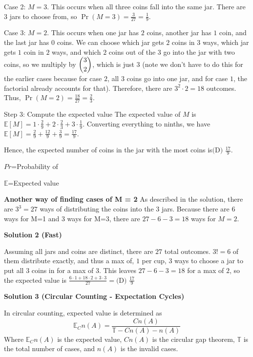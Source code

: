 \begin{enumerate}
 Case 2:  $M = 3$. This occurs when all three coins fall into the same jar. There are $3$ jars to choose from, so $\Pr(M=3) = \frac{3}{27} = \frac{1}{9}$.

 Case 3:  $M = 2$. This occurs when one jar has $2$ coins, another jar has $1$ coin, and the last jar has $0$ coins.  We can choose which jar gets $2$ coins in $3$ ways, which jar gets $1$ coin in $2$ ways, and which $2$ coins out of the $3$ go into the jar with two coins, so we multiply by $\dbinom{3}{2}$, which is just $3$ (note we don't have to do this for the earlier cases because for case $2$, all $3$ coins go into one jar, and for case $1$, the factorial already accounts for that). Therefore, there are $3^2 \cdot 2 = 18$ outcomes. Thus, $\Pr(M=2) = \frac{18}{27} = \frac{2}{3}$.

 Step 3: Compute the expected value The expected value of $M$ is $\mathbb{E}[M] = 1 \cdot \frac{2}{9} + 2 \cdot \frac{2}{3} + 3 \cdot \frac{1}{9}$.  Converting everything to ninths, we have $\mathbb{E}[M] = \frac{2}{9} + \frac{12}{9} + \frac{3}{9} = \frac{17}{9}$.

 Hence, the expected number of coins in the jar with the most coins is$\boxed{\text{(D) }\frac{17}{9}}$.

 $Pr$=Probability of

 $\mathbb{E}$=Expected value

 


 \textbf{Another way of finding cases of M = 2} As described in the solution, there are $3^3=27$ ways of distributing the coins into the $3$ jars. Because there are $6$ ways for M=1 and $3$ ways for M=3, there are $27 - 6 - 3 = 18$ ways for $M=2$.

 



\textbf{Solution 2 (Fast)}

Assuming all jars and coins are distinct, there are $27$ total outcomes. $3!=6$ of them distribute exactly, and thus a max of, $1$ per cup, $3$ ways to choose a jar to put all $3$ coins in for a max of $3$. This leaves $27-6-3=18$ for a max of $2$, so the expected value is $\frac{6 \cdot 1 + 18 \cdot 2 + 3 \cdot 3}{27} = \boxed{\text{(D) }\frac{17}{9}}$




\textbf{Solution 3 (Circular Counting - Expectation Cycles)}

In circular counting, expected value is determined as
 \[\mathbb{E}_C n(A) = \frac{C n(A)}{\mathbb{T} - C n(A) - n(A)}\]Where \( \mathbb{E}_C n(A) \) is the expected value, \( C n(A) \) is the circular gap theorem, \( \mathbb{T} \) is the total number of cases, and \( n(A) \) is the invalid cases.


\end{enumerate}
